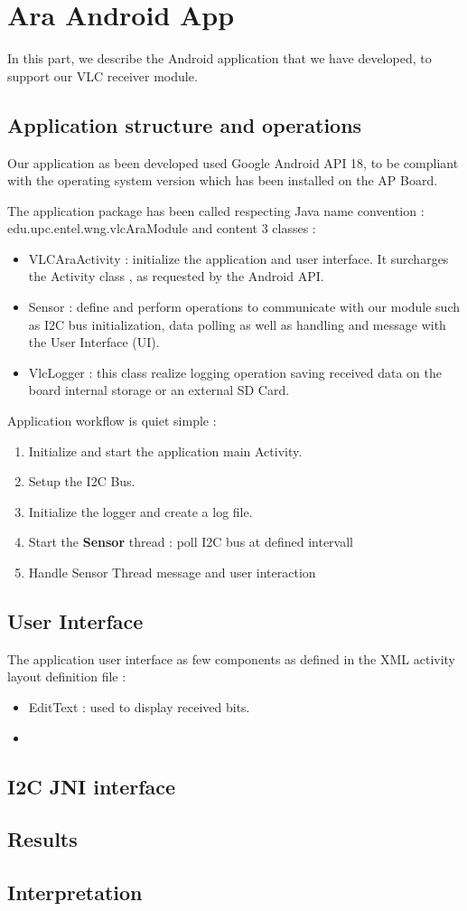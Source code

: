 \section{Ara Android App}

In this part, we describe the Android application that we have developed, to support our VLC receiver module.

\subsection{Application structure and operations}
Our application as been developed used Google Android API 18, to be compliant with the operating system version which has been installed on the AP Board.

The application package has been called respecting Java name convention : edu.upc.entel.wng.vlcAraModule and content 3 classes :

\begin{itemize}
\item VLCAraActivity : initialize the application and user interface. It surcharges the Activity class , as requested by the Android API.
\item Sensor : define and perform operations to communicate with our module such as I2C bus initialization, data polling as well as handling and message with the User Interface (UI).
\item VlcLogger : this class realize logging operation saving received data on the board internal storage or an external SD Card.
\end{itemize}

Application workflow is quiet simple :
\begin{enumerate}
\item Initialize and start the application main Activity.
\item Setup the I2C Bus.
\item Initialize the logger and create a log file.
\item Start the \textbf{Sensor} thread : poll I2C bus at defined intervall 
\item Handle Sensor Thread message and user interaction
\end{enumerate}

\subsection{User Interface}

The application user interface as few components as defined in the XML activity layout definition file :
\begin{itemize}
\item EditText : used to display received bits.
\item 
\end{itemize}

\subsection{I2C JNI interface}
\subsection{Results}
\subsection{Interpretation}